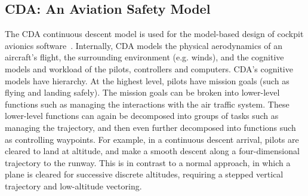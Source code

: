 \documentclass[10pt,journal,compsoc]{IEEEtran}
\begin{document}


\subsection{CDA: An Aviation Safety Model}\label{sec:cda}

The CDA continuous descent model is used for the model-based design of cockpit avionics software~\cite{Kim2011,Pritchett2011,Feigh2012,Kim2013,Pritchett2013}.
Internally, CDA
models the physical aerodynamics of an aircraft's flight, the surrounding environment (e.g. winds), and the cognitive models and workload of the pilots, controllers and computers.
CDA's cognitive models have hierarchy.
At the highest level, pilots have mission goals (such as flying and landing safely).
The mission goals can be broken into lower-level functions such as managing the interactions with the air traffic system.
These lower-level functions can again be decomposed into groups of tasks such as managing the trajectory, and then even further decomposed into functions such as controlling waypoints.
For example,
in a continuous descent arrival, pilots are cleared to land at altitude, and make a smooth descent along a four-dimensional trajectory to the runway.  
This is in contrast to a normal approach, in which a plane is cleared for successive discrete altitudes, requiring a stepped vertical trajectory and low-altitude vectoring.  
\end{document}
